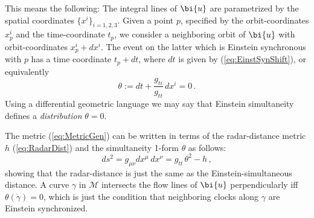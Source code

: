 \documentclass
[rmp,aps,twocolumn,showpacs,preprintnumbers,amsmath,amssymb]{revtex4}
\theoremstyle{plain}
\theoremstyle{definition}
\theoremstyle{remark}
\newcommand{\M}{\mathcal{M}}                      %
\newcommand{\bu}{\bi{u}}
\begin{document}
This means the following: The integral lines of $\bu$ are parametrized 
by the spatial coordinates $\{x^i\}_{i=1,2,3}$. Given a point $p$, 
specified by the orbit-coordinates $x^i_p$ and the time-coordinate 
$t_p$, we consider a neighboring orbit of 
$\bu$ with orbit-coordinates $x^i_p+dx^i$. The event on the latter which 
is Einstein synchronous with $p$ has a time coordinate $t_p+dt$, where 
$dt$ is given by (\ref{eq:EinstSynShift}), or equivalently 
%
\begin{equation}\label{eqSynchConnForm}
  \theta := dt+\frac{g_{ti}}{g_{tt}}\,dx^i = 0\,.
\end{equation}
%
Using a differential geometric language we may say that
Einstein simultaneity defines a \emph{distribution} $\theta=0$. 

The metric (\ref{eq:MetricGen}) can be written in terms of the 
radar-distance metric $h$ (\ref{eq:RadarDist}) and the simultaneity 
1-form $\theta$ as follows: 
%
\begin{equation}\label{eq:MetricGenAlt}
  ds^2 = g_{\mu\nu}dx^\mu\,dx^\nu = g_{tt}\,\theta^2-h\,,
\end{equation}
%
showing that the radar-distance is just the same as the 
Einstein-simultaneous distance. A curve $\gamma$ in $\M$ intersects 
the flow lines of $\bu$ perpendicularly iff $\theta(\dot\gamma)=0$, 
which is just the condition that neighboring clocks along 
$\gamma$ are Einstein synchronized. 
\end{document}
